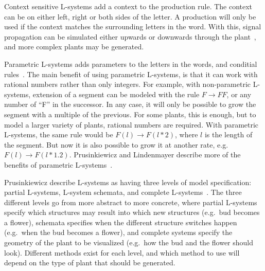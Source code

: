 Context sensitive L-systems add a context to the production rule.
The context can be on either left, right or both sides of the letter.
A production will only be used if the context matches the surrounding letters in the word.
With this, signal propagation can be simulated either upwards or downwards through the plant~\cite{Prusinkiewicz2012}, and more complex plants may be generated.

Parametric L-systems adds parameters to the letters in the words, and conditial rules~\cite{Prusinkiewicz2012}.
The main benefit of using parametric L-systems, is that it can work with rational numbers rather than only integers.
For example, with non-parametric L-systems, extension of a segment can be modeled with the rule $F\rightarrow FF$, or any number of ``F'' in the successor.
In any case, it will only be possible to grow the segment with a multiple of the previous.
For some plants, this is enough, but to model a larger variety of plants, rational numbers are required.
With parametric L-systems, the same rule would be $F(l)\rightarrow F(l*2)$, where $l$ is the length of the segment.
But now it is also possible to grow it at another rate, e.g.\ $F(l)\rightarrow F(l*1.2)$.
Prusinkiewicz and Lindenmayer describe more of the benefits of parametric L-systems~\cite{Prusinkiewicz2012}.

Prusinkiewicz describe L-systems as having three levels of model specification: partial L-systems, L-system schemata, and complete L-systems~\cite{Prusinkiewicz2012}.
The three different levels go from more abstract to more concrete, where partial L-systems specify which structures may result into which new structures (e.g.\ bud becomes a flower), schemata specifies when the different structure switches happen (e.g.\ when the bud becomes a flower), and complete systems specify the geometry of the plant to be visualized (e.g.\ how the bud and the flower should look).
Different methods exist for each level, and which method to use will depend on the type of plant that should be generated.

